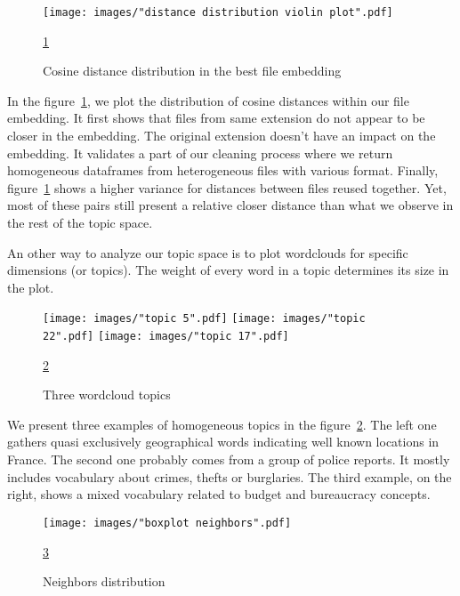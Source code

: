 \documentclass[a4paper]{article}
\begin{document}
	\begin{figure}
		\centering
		\texttt{[image: images/"distance distribution violin plot".pdf]}
		\caption{Cosine distance distribution in the best file embedding}
		\ref{fig:distance-distribution}
		\label{fig:distance-distribution}
	\end{figure}
	
	In the figure~\ref{fig:distance-distribution}, we plot the distribution of cosine distances within our file embedding. It first shows that files from same extension do not appear to be closer in the embedding. The original extension doesn't have an impact on the embedding. It validates a part of our cleaning process where we return homogeneous dataframes from heterogeneous files with various format. Finally, figure~\ref{fig:distance-distribution} shows a higher variance for distances between files reused together. Yet, most of these pairs still present a relative closer distance than what we observe in the rest of the topic space.
	
	An other way to analyze our topic space is to plot wordclouds for specific dimensions (or topics). The weight of every word in a topic determines its size in the plot.
	
	\begin{figure}[]
		\texttt{[image: images/"topic 5".pdf]}
		\label{fig:wc-region}
		\endminipage\hfill
		\texttt{[image: images/"topic 22".pdf]}
		\label{fig:wc-police}
		\endminipage\hfill
		\texttt{[image: images/"topic 17".pdf]}
		\label{fig:wc-budget}
		\endminipage
		\caption{Three wordcloud topics}
		\label{fig:wc}
		\ref{fig:wc}
	\end{figure}

	We present three examples of homogeneous topics in the figure~\ref{fig:wc}. The left one gathers quasi exclusively geographical words indicating well known locations in France. The second one probably comes from a group of police reports. It mostly includes vocabulary about crimes, thefts or burglaries. The third example, on the right, shows a mixed vocabulary related to budget and bureaucracy concepts.
	
	\begin{figure}[]
		\texttt{[image: images/"boxplot neighbors".pdf]}
		\caption{Neighbors distribution}
		\label{fig:neighbors}
		\ref{fig:neighbors}
	\end{figure}
\end{document}
